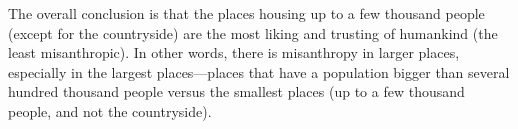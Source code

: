 \documentclass[11pt, letterpaper]{article}
\begin{document}
\begin{spacing}{1.4}
 The overall conclusion is that the places housing up to a few thousand people
 (except for the countryside) are the most liking and trusting of humankind (the least
 misanthropic). In other words, there is misanthropy in larger places, especially in the largest places---places that have a population bigger than several hundred thousand people versus the smallest places (up to a few thousand people, and not the countryside).







 



\end{spacing}
\end{document}
